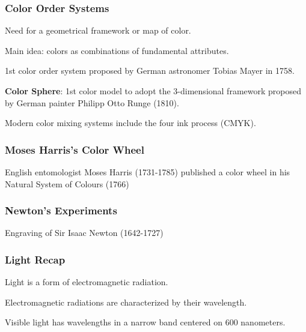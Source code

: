 \documentclass[12pt]{beamer}\usepackage[]{graphicx}\usepackage[]{color}
\begin{document}
\begin{frame}
\frametitle{Color Order Systems}

\bbi
  \item Need for a geometrical framework or map of color.
  \item Main idea: colors as combinations of fundamental attributes.
  \item 1st color order system proposed by German astronomer Tobias Mayer 
  in 1758.
  \item \textbf{Color Sphere}: 1st color model to adopt the 3-dimensional 
  framework proposed by German painter Philipp Otto Runge (1810).
  \item Modern color mixing systems include the four ink process (CMYK).
\ei

\end{frame}


\begin{frame}
\frametitle{Moses Harris's Color Wheel}
\begin{center}

{\small English entomologist Moses Harris (1731-1785) published a color wheel in his Natural System of Colours (1766)}
\end{center}
\end{frame}


\begin{frame}
\begin{center}
\Huge{}
\end{center}
\end{frame}


\begin{frame}
\frametitle{Newton's Experiments}
\begin{center}

{\scriptsize {\lolit Engraving of Sir Isaac Newton (1642-1727)}}
\end{center}
\end{frame}


\begin{frame}
\frametitle{Light Recap}

\bbi
  \item Light is a form of electromagnetic radiation.
  \item Electromagnetic radiations are characterized by their wavelength.
  \item Visible light has wavelengths in a narrow band centered on 600 nanometers.
\ei

\end{frame}
\end{document}
